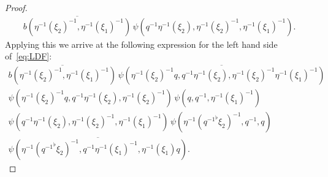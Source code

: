 \documentclass[a4paper,11pt,reqno]{amsart}
\numberwithin{equation}{section}
\theoremstyle{remark}
\theoremstyle{definition}
\begin{document}
\begin{proof}
\begin{multline*}
\overline {b(\eta^{-1}(\xi_2)^{-1},\eta^{-1}(\xi_1)^{-1})}\,\psi(q^{-1}\eta^{-1}(\xi_2),\eta^{-1}(\xi_2)^{-1},\eta^{-1}(\xi_1)^{-1}).
\end{multline*}
Applying this we arrive at the following expression for the left hand side of~\eqref{eq:LDF}:
\begin{multline*}
\overline {b(\eta^{-1}(\xi_2)^{-1},\eta^{-1}(\xi_1)^{-1})}\,
\overline {\psi(\eta^{-1}(\xi_2)^{-1}q,q^{-1}\eta^{-1}(\xi_2),\eta^{-1}(\xi_2)^{-1}\eta^{-1}(\xi_1)^{-1})}\\
\psi(\eta^{-1}(\xi_2)^{-1}q,q^{-1}\eta^{-1}(\xi_2),\eta^{-1}(\xi_2)^{-1})\,\psi(q,q^{-1},\eta^{-1}(\xi_1)^{-1})\\
\psi(q^{-1}\eta^{-1}(\xi_2),\eta^{-1}(\xi_2)^{-1},\eta^{-1}(\xi_1)^{-1})\,
\psi(\eta^{-1}({q^{-1}}^\flat\xi_2)^{-1},q^{-1},q)\\
\overline  {\psi(\eta^{-1}({q^{-1}}^\flat\xi_2)^{-1},q^{-1}\eta^{-1}(\xi_1)^{-1},\eta^{-1}(\xi_1)q)}.
\end{multline*}


\end{proof}
\end{document}
